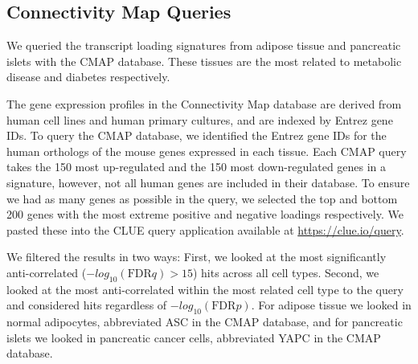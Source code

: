 \documentclass[
]{article}
\begin{document}
\subsection{Connectivity Map Queries}\label{connectivity-map-queries}

We queried the transcript loading signatures from adipose tissue and
pancreatic islets with the CMAP database. These tissues are the most
related to metabolic disease and diabetes respectively.

The gene expression profiles in the Connectivity Map database are
derived from human cell lines and human primary cultures, and are
indexed by Entrez gene IDs. To query the CMAP database, we identified
the Entrez gene IDs for the human orthologs of the mouse genes expressed
in each tissue. Each CMAP query takes the 150 most up-regulated and the
150 most down-regulated genes in a signature, however, not all human
genes are included in their database. To ensure we had as many genes as
possible in the query, we selected the top and bottom 200 genes with the
most extreme positive and negative loadings respectively. We pasted
these into the CLUE query application available at
\url{https://clue.io/query}.

We filtered the results in two ways: First, we looked at the most
significantly anti-correlated (\(-log_{10}(\mathrm{FDR} q) > 15\)) hits
across all cell types. Second, we looked at the most anti-correlated
within the most related cell type to the query and considered hits
regardless of \(-log_{10}(\mathrm{FDR} p)\). For adipose tissue we
looked in normal adipocytes, abbreviated ASC in the CMAP database, and
for pancreatic islets we looked in pancreatic cancer cells, abbreviated
YAPC in the CMAP database.



\end{document}

